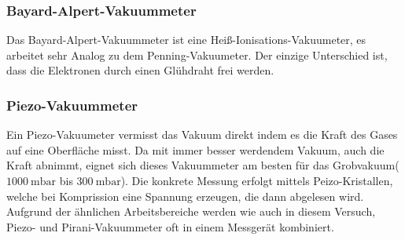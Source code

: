 		\subsubsection{Bayard-Alpert-Vakuummeter}

			\noindent
			Das Bayard-Alpert-Vakuummeter ist eine Heiß-Ionisations-Vakuumeter, es arbeitet sehr Analog zu dem Penning-Vakuumeter.
			Der einzige Unterschied ist, dass die Elektronen durch einen Glühdraht frei werden.
		
		\subsubsection{Piezo-Vakuummeter}
			
			\noindent
			Ein Piezo-Vakuumeter vermisst das Vakuum direkt indem es die Kraft des Gases auf eine Oberfläche misst. 
			Da mit immer besser werdendem Vakuum, auch die Kraft abnimmt, eignet sich dieses Vakuummeter am besten für das Grobvakuum($\SI{1000}{\milli\bar}$ bis $\SI{300}{\milli\bar}$).
			Die konkrete Messung erfolgt mittels Peizo-Kristallen, welche bei Komprission eine Spannung erzeugen, die dann abgelesen wird.
			Aufgrund der ähnlichen Arbeitsbereiche werden wie auch in diesem Versuch, Piezo- und Pirani-Vakuummeter oft in einem Messgerät kombiniert.
